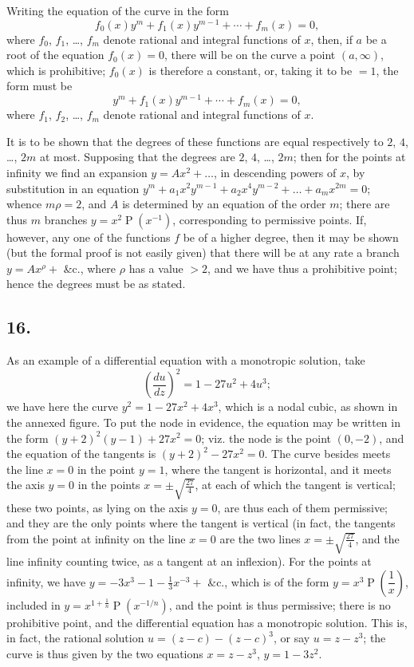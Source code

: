 \documentclass[11pt,a4paper]{article}
\theoremstyle{definition}
\DeclareMathOperator{\Pf}{P}
\begin{document}
Writing the equation of the curve in the form
\[
f_0(x)y^m + f_1(x)y^{m-1} + \cdots + f_m(x) = 0,
\]
where $f_0$, $f_1$, \ldots, $f_m$ denote rational and integral functions of $x$, then, if $a$ be a root of the equation $f_0(x) = 0$, there will be on the curve a point $(a, \infty)$, which is prohibitive; $f_0(x)$ is therefore a constant, or, taking it to be $= 1$, the form must be
\[
y^m + f_1(x)y^{m-1} + \cdots + f_m(x) = 0,
\]
where $f_1$, $f_2$, \ldots, $f_m$ denote rational and integral functions of $x$.

It is to be shown that the degrees of these functions are equal respectively to $2$, $4$, \ldots, $2m$ at most. Supposing that the degrees are $2$, $4$, \ldots, $2m$; then for the points at infinity we find an expansion $y = Ax^2 + \ldots$, in descending powers of $x$, by substitution in an equation $y^m + a_1 x^2 y^{m-1} + a_2 x^4 y^{m-2} + \ldots + a_m x^{2m} = 0$; whence $m\rho = 2$, and $A$ is determined by an equation of the order $m$; there are thus $m$ branches $y = x^2 \Pf(x^{-1})$, corresponding to permissive points. If, however, any one of the functions $f$ be of a higher degree, then it may be shown (but the formal proof is not easily given) that there will be at any rate a branch $y = Ax^\rho +$ \&c., where $\rho$ has a value $> 2$, and we have thus a prohibitive point; hence the degrees must be as stated.

\subsection*{16.}

As an example of a differential equation with a monotropic solution, take
\[
\left(\frac{du}{dz}\right)^2 = 1 - 27u^2 + 4u^3;
\]
we have here the curve $y^2 = 1 - 27x^2 + 4x^3$, which is a nodal cubic, as shown in the annexed figure. To put the node in evidence, the equation may be written in the form $(y + 2)^2(y - 1) + 27x^2 = 0$; viz. the node is the point $(0, -2)$, and the equation of the tangents is $(y + 2)^2 - 27x^2 = 0$. The curve besides meets the line $x = 0$ in the point $y = 1$, where the tangent is horizontal, and it meets the axis $y = 0$ in the points $x = \pm\sqrt{\frac{27}{4}}$, at each of which the tangent is vertical; these two points, as lying on the axis $y = 0$, are thus each of them permissive; and they are the only points where the tangent is vertical (in fact, the tangents from the point at infinity on the line $x = 0$ are the two lines $x = \pm\sqrt{\frac{27}{4}}$, and the line infinity counting twice, as a tangent at an inflexion). For the points at infinity, we have $y = -3x^3 - 1 - \tfrac{1}{3}x^{-3} +$ \&c., which is of the form $y = x^3 \Pf\left(\dfrac{1}{x}\right)$, included in $y = x^{1 + \frac{1}{n}} \Pf(x^{-1/n})$, and the point is thus permissive; there is no prohibitive point, and the differential equation has a monotropic solution. This is, in fact, the rational solution $u = (z - c) - (z - c)^3$, or say $u = z - z^3$; the curve is thus given by the two equations $x = z - z^3$, $y = 1 - 3z^2$.
\end{document}
